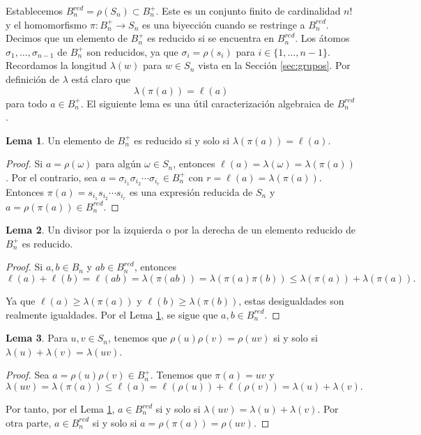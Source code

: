 \documentclass[12pt]{book}
\theoremstyle{definition}
\newtheorem{lema}{Lema}[section]
\begin{document}
Establecemos $B_n^{red}=\rho(S_n)\subset B_n^+$. Este es un conjunto finito de cardinalidad $n!$ y el homomorfismo $\pi:B_n^+\rightarrow S_n$ es una biyección cuando se restringe a $B_n^{red}$. Decimos que un elemento de $B_n^+$ es reducido si se encuentra en $B_n^{red}$. Los átomos $\sigma_1,\ldots,\sigma_{n-1}$ de $B_n^+$ son reducidos, ya que $\sigma_i=\rho(s_i)$ para $i\in\{1,\ldots,n-1\}$. Recordamos la longitud $\lambda(w)$ para $w\in S_n$ vista en la Sección \ref{sec:grupos}. Por definición de $\lambda$ está claro que
$$\lambda(\pi(a))=\ell(a)$$
para todo $a\in B_n^+$. El siguiente lema es una útil caracterización algebraica de $B_n^{red}$.

\begin{lema}
Un elemento de $B_n^+$ es reducido si y solo si $\lambda(\pi(a))=\ell(a)$.
\label{lema:reduced1}
\end{lema}

\begin{proof} Si $a=\rho(\omega)$ para algún $\omega\in S_n$, entonces $\ell(a)=\lambda(\omega)=\lambda(\pi(a))$. Por el contrario, sea $a=\sigma_{i_1}\sigma_{i_2}\cdots \sigma_{i_r}\in B_n^+$ con $r=\ell(a)=\lambda(\pi(a))$. Entonces $\pi(a)=s_{i_1}s_{i_2}\cdots s_{i_r}$ es una expresión reducida de $S_n$ y $a=\rho(\pi(a))\in B_n^{red}$.
\end{proof}

\begin{lema}
Un divisor por la izquierda o por la derecha de un elemento reducido de $B_n^+$ es reducido.
\label{lema:reduced2}
\end{lema}

\begin{proof} Si $a,b\in B_n$ y $ab\in B_n^{red}$, entonces
$$\ell(a) + \ell(b)= \ell(ab)=\lambda(\pi(ab))=\lambda(\pi(a)\pi(b))\leq \lambda(\pi(a))+\lambda(\pi(a)).$$

Ya que $\ell(a)\geq \lambda(\pi(a))$ y $\ell(b)\geq \lambda(\pi(b))$, estas desigualdades son realmente igualdades. Por el Lema \ref{lema:reduced1}, se sigue que $a,b\in B_n^{red}$.\end{proof}

\begin{lema}
Para $u,v\in S_n$, tenemos que $\rho(u)\rho(v)=\rho(uv)$ si y solo si $\lambda(u)+\lambda(v)=\lambda(uv)$.
\label{lema:longi}
\end{lema}

\begin{proof} Sea $a=\rho(u)\rho(v)\in B_n^+$. Tenemos que $\pi(a)= uv$ y 
$$\lambda(uv)=\lambda(\pi(a))\leq\ell(a)=\ell(\rho(u))+\ell(\rho(v))=\lambda(u)+\lambda(v).$$

Por tanto, por el Lema \ref{lema:reduced1}, $a\in B_n^{red}$ si y solo si $\lambda(uv)=\lambda(u)+\lambda(v)$. Por otra parte, $a\in B_n^{red}$ si y solo si $a=\rho(\pi(a))=\rho(uv)$.
\end{proof}
\end{document}
